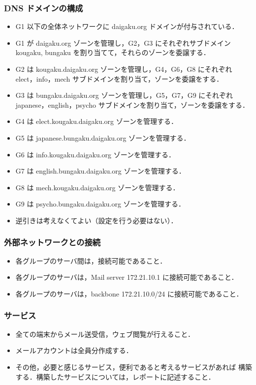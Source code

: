 \subsubsection{DNS ドメインの構成}
\begin{itemize}
\item G1 以下の全体ネットワークに daigaku.org ドメインが付与されている．
\item G1 が daigaku.org ゾーンを管理し，G2，G3 にそれぞれサブドメイン
  kougaku, bungaku を割り当てて，それらのゾーンを委譲する．
\item G2 は kougaku.daigaku.org ゾーンを管理し，G4，G6，G8 にそれぞれ
  elect，info，mech サブドメインを割り当て，ゾーンを委譲をする．
\item G3 は bungaku.daigaku.org ゾーンを管理し，G5，G7，G9 にそれぞれ
  japanese，english，psycho サブドメインを割り当て，ゾーンを委譲をする．
\item G4 は elect.kougaku.daigaku.org ゾーンを管理する．
\item G5 は japanese.bungaku.daigaku.org ゾーンを管理する．
\item G6 は info.kougaku.daigaku.org ゾーンを管理する．
\item G7 は english.bungaku.daigaku.org ゾーンを管理する．
\item G8 は mech.kougaku.daigaku.org ゾーンを管理する．
\item G9 は psycho.bungaku.daigaku.org ゾーンを管理する．
\item 逆引きは考えなくてよい（設定を行う必要はない）．
\end{itemize}

\subsubsection{外部ネットワークとの接続}
\begin{itemize}
\item 各グループのサーバ間は，接続可能であること．
\item 各グループのサーバは，Mail server 172.21.10.1 に接続可能であること．
\item 各グループのサーバは，backbone 172.21.10.0/24 に接続可能であること．
\end{itemize}

\subsubsection{サービス}
\begin{itemize}
\item 全ての端末からメール送受信，ウェブ閲覧が行えること．
\item メールアカウントは全員分作成する．
\item その他，必要と感じるサービス，便利であると考えるサービスがあれば
  構築する．構築したサービスについては，レポートに記述すること．
\end{itemize}


